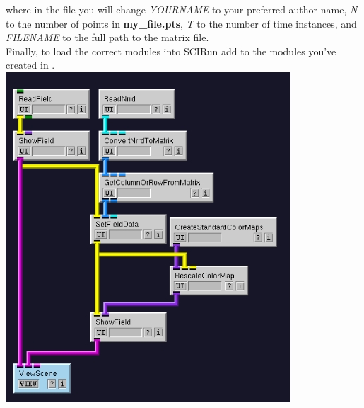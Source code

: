\documentclass{article}
\begin{document}
where in the file you will change \textit{YOURNAME} to your preferred author name, \textit{N} to the number of points in \textbf{my\_file.pts}, \textit{T} to the number of time instances, and \textit{FILENAME} to the full path to the matrix file.\\

Finally, to load the correct modules into SCIRun add to the modules you've created in .\\

\includegraphics[width=0.8\textwidth]{images/voltage_example.png}
\end{document}
